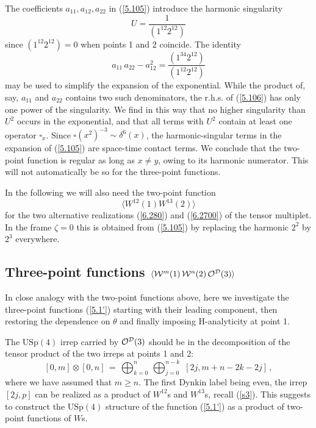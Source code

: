 \documentclass[a4paper,11pt]{article}
\begin{document}
The coefficients $a_{11}, a_{12}, a_{22}$ in (\ref{5.105}) introduce the
harmonic singularity
\begin{equation} \label{5.1055}
U = \frac{1}{(1^{12}2^{12})}
\end{equation}
since $(1^{12}2^{12})=0$ when points 1 and 2 coincide. The identity
\begin{equation} \label{5.106}
a_{11} \, a_{22} - a_{12}^2 = \frac{(1^{34} 2^{12})}{(1^{12}2^{12})}
\end{equation}
may be used to simplify the expansion of the exponential. While the product of,
say, $a_{11}$ and $a_{22}$ contains two such denominators, the r.h.s. of
(\ref{5.106}) has only one power of the singularity. We find in this way that
no higher singularity than $U^2$ occurs in the exponential, and that all terms
with $U^2$ contain at least one operator $\square_x$. Since $\square (x^2)^{-3}
\sim \delta^6(x)$, the harmonic-singular terms in the expansion of
(\ref{5.105}) are space-time contact terms. We conclude that the two-point
function is regular as long as $x\neq y$, owing to its harmonic numerator. This
will not automatically be so for the three-point functions.

In the following we will also need the two-point function
\begin{equation} \label{5.107}
\langle W^{12}(1) W^{13}(2) \rangle
\end{equation}
for the two alternative realizations (\ref{6.280}) and (\ref{6.2700}) of the
tensor multiplet. In the frame $\zeta=0$ this is obtained from (\ref{5.105}) by
replacing the harmonic $2^2$ by $2^3$ everywhere.

\subsection{Three-point functions $\langle {\cal W}^{m}(1) \,
  {\cal W}^{n}(2) \, {\cal O}^{\cal D}(3) \rangle$}

In close analogy with the two-point functions above, here we
investigate the three-point functions (\ref{5.1'}) starting with
their leading component, then restoring the dependence on $\theta$
and finally imposing H-analyticity at point 1.

The $\mbox{USp}(4)$ irrep carried by ${\cal O}^{\cal D}(3)$ should be in the
decomposition of the tensor product of the two irreps at points 1 and 2:
\begin{equation}\label{5.2}
[0,m] \otimes [0,n] \, = \, \bigoplus_{k=0}^n \, \bigoplus_{j=0}^{n-k} \, \,
[2j, m+n - 2k -2j] \, ,
\end{equation}
where we have assumed that $m\geq n$. The first Dynkin label being even, the
irrep $[2j,p]$ can be realized as a product of $W^{12}$s and  $W^{13}$s,
recall (\ref{s3}). This suggests to construct the $\mbox{USp}(4)$ structure of
the function (\ref{5.1'}) as a product of two-point functions of $W$s.
\end{document}
